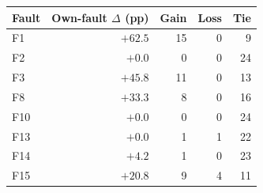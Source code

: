 \begin{tabular}{lrrrr}
\toprule
Fault & Own-fault $\Delta$ (pp) & Gain & Loss & Tie \\
\midrule
F1 & $+62.5$ & 15 & 0 & 9  \\
F2 & $+0.0$ & 0 & 0 & 24  \\
F3 & $+45.8$ & 11 & 0 & 13  \\
F8 & $+33.3$ & 8 & 0 & 16  \\
F10 & $+0.0$ & 0 & 0 & 24  \\
F13 & $+0.0$ & 1 & 1 & 22  \\
F14 & $+4.2$ & 1 & 0 & 23  \\
F15 & $+20.8$ & 9 & 4 & 11  \\
\bottomrule
\end{tabular}
